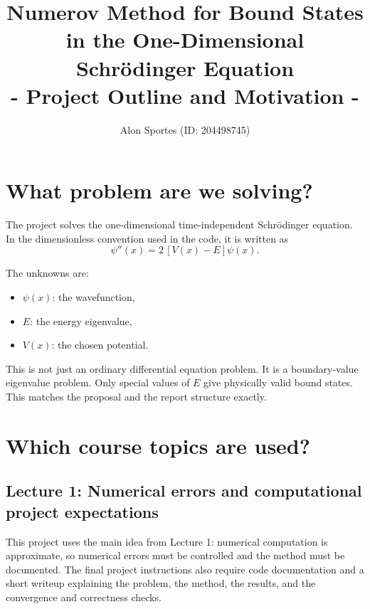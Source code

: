 \documentclass[11pt]{article}
\title{\textbf{Numerov Method for Bound States in the One-Dimensional Schr\"odinger Equation}\\ 
       \textbf{- Project Outline and Motivation -}}
\author{Alon Sportes (ID: 204498745)}
\date{}
\begin{document}
    \maketitle

    \vfill

    \begingroup
        \setlength{\parskip}{0pt}
        \tableofcontents
    \endgroup
    \vfill

    \newpage
    \begingroup
        \setlength{\parskip}{0pt}
        \listoffigures
    \endgroup

    \newpage

    \section{What problem are we solving?}

    The project solves the one-dimensional time-independent Schr\"odinger equation. In the dimensionless convention used in the code, it is written as
    \begin{equation}
        \psi''(x) = 2\,[V(x)-E]\psi(x).
    \end{equation}

    The unknowns are:
    \begin{itemize}
        \item $\psi(x)$: the wavefunction,
        \item $E$: the energy eigenvalue,
        \item $V(x)$: the chosen potential.
    \end{itemize}

    This is not just an ordinary differential equation problem. It is a boundary-value eigenvalue problem. Only special values of $E$ give physically valid bound states. This matches the proposal and the report structure exactly.

    \section{Which course topics are used?}

    \subsection{Lecture 1: Numerical errors and computational project expectations}

    This project uses the main idea from Lecture 1: numerical computation is approximate, so numerical errors must be controlled and the method must be documented. The final project instructions also require code documentation and a short writeup explaining the problem, the method, the results, and the convergence and correctness checks.
\end{document}
